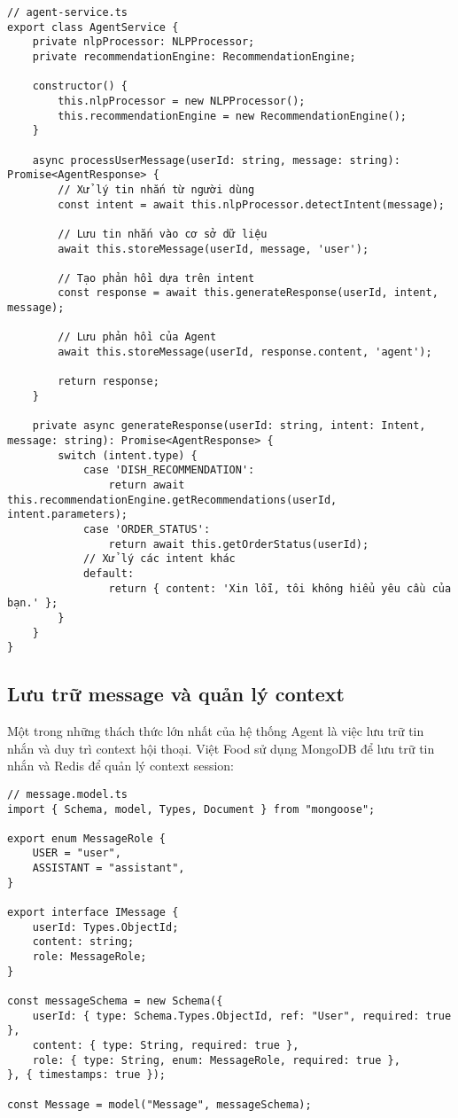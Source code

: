 \begin{verbatim}
// agent-service.ts
export class AgentService {
    private nlpProcessor: NLPProcessor;
    private recommendationEngine: RecommendationEngine;
    
    constructor() {
        this.nlpProcessor = new NLPProcessor();
        this.recommendationEngine = new RecommendationEngine();
    }
    
    async processUserMessage(userId: string, message: string): Promise<AgentResponse> {
        // Xử lý tin nhắn từ người dùng
        const intent = await this.nlpProcessor.detectIntent(message);
        
        // Lưu tin nhắn vào cơ sở dữ liệu
        await this.storeMessage(userId, message, 'user');
        
        // Tạo phản hồi dựa trên intent
        const response = await this.generateResponse(userId, intent, message);
        
        // Lưu phản hồi của Agent
        await this.storeMessage(userId, response.content, 'agent');
        
        return response;
    }
    
    private async generateResponse(userId: string, intent: Intent, message: string): Promise<AgentResponse> {
        switch (intent.type) {
            case 'DISH_RECOMMENDATION':
                return await this.recommendationEngine.getRecommendations(userId, intent.parameters);
            case 'ORDER_STATUS':
                return await this.getOrderStatus(userId);
            // Xử lý các intent khác
            default:
                return { content: 'Xin lỗi, tôi không hiểu yêu cầu của bạn.' };
        }
    }
}
\end{verbatim}

\subsection{Lưu trữ message và quản lý context}

Một trong những thách thức lớn nhất của hệ thống Agent là việc lưu trữ tin nhắn và duy trì context hội thoại. Việt Food sử dụng MongoDB để lưu trữ tin nhắn và Redis để quản lý context session:

\begin{verbatim}
// message.model.ts
import { Schema, model, Types, Document } from "mongoose";

export enum MessageRole {
    USER = "user",
    ASSISTANT = "assistant",
}

export interface IMessage {
    userId: Types.ObjectId;
    content: string;
    role: MessageRole;
}

const messageSchema = new Schema({
    userId: { type: Schema.Types.ObjectId, ref: "User", required: true },
    content: { type: String, required: true },
    role: { type: String, enum: MessageRole, required: true },
}, { timestamps: true });

const Message = model("Message", messageSchema);
\end{verbatim}

